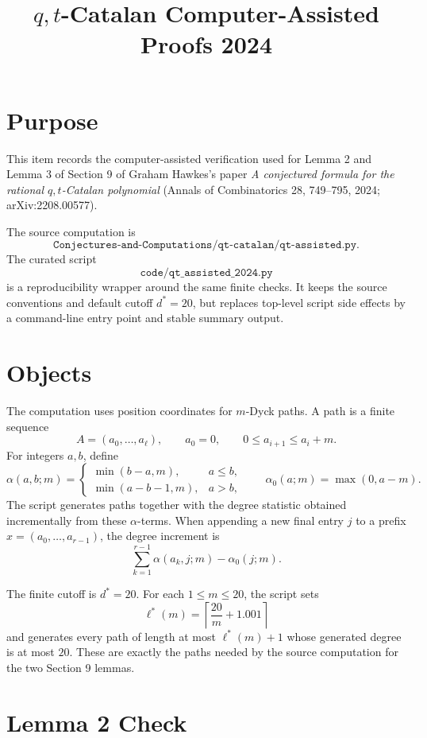 \documentclass{article}
\title{\(q,t\)-Catalan Computer-Assisted Proofs 2024}
\author{}
\date{}
\begin{document}
\maketitle

\section{Purpose}

This item records the computer-assisted verification used for Lemma 2 and
Lemma 3 of Section 9 of Graham Hawkes's paper
\emph{A conjectured formula for the rational \(q,t\)-Catalan polynomial}
(Annals of Combinatorics 28, 749--795, 2024; arXiv:2208.00577).

The source computation is
\[
  \texttt{Conjectures-and-Computations/qt-catalan/qt-assisted.py}.
\]
The curated script
\[
  \texttt{code/qt\_assisted\_2024.py}
\]
is a reproducibility wrapper around the same finite checks.  It keeps the
source conventions and default cutoff \(d^*=20\), but replaces top-level script
side effects by a command-line entry point and stable summary output.

\section{Objects}

The computation uses position coordinates for \(m\)-Dyck paths.  A path is a
finite sequence
\[
  A=(a_0,\ldots,a_\ell),\qquad a_0=0,\qquad
  0\le a_{i+1}\le a_i+m.
\]
For integers \(a,b\), define
\[
  \alpha(a,b;m)=
  \begin{cases}
    \min(b-a,m), & a\le b,\\
    \min(a-b-1,m), & a>b,
  \end{cases}
  \qquad
  \alpha_0(a;m)=\max(0,a-m).
\]
The script generates paths together with the degree statistic obtained
incrementally from these \(\alpha\)-terms.  When appending a new final entry
\(j\) to a prefix \(x=(a_0,\ldots,a_{r-1})\), the degree increment is
\[
  \sum_{k=1}^{r-1}\alpha(a_k,j;m)-\alpha_0(j;m).
\]

The finite cutoff is \(d^*=20\).  For each \(1\le m\le20\), the script sets
\[
  \ell^*(m)=\left\lceil\frac{20}{m}+1.001\right\rceil
\]
and generates every path of length at most \(\ell^*(m)+1\) whose generated
degree is at most \(20\).  These are exactly the paths needed by the source
computation for the two Section 9 lemmas.

\section{Lemma 2 Check}
\end{document}
